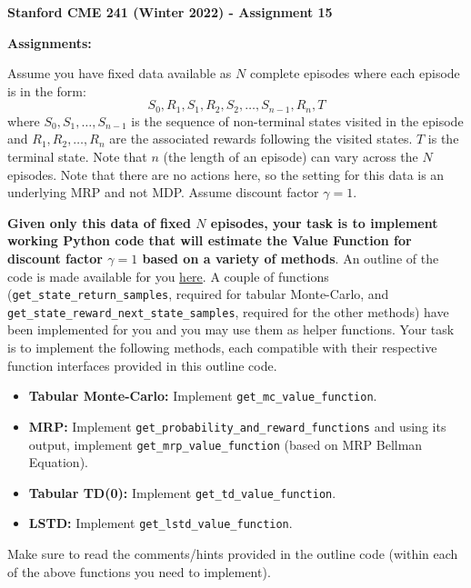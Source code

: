 \documentclass[12pt]{exam}
\begin{document}
\begin{center}
{\large {\bf Stanford CME 241 (Winter 2022) - Assignment 15}}
\end{center}
 
{\large{\bf Assignments:}}
\begin{questions}

\question Assume you have fixed data available as $N$ complete episodes where each episode is in the form:
$$S_0,R_1,S_1,R_2, S_2,\ldots, S_{n-1},R_n, T$$
where $S_0,S_1,\ldots,S_{n-1}$ is the sequence of non-terminal states visited in the episode and $R_1,R_2,\ldots,R_n$ are the associated rewards following the visited states. $T$ is the terminal state. Note that $n$ (the length of an episode) can vary across the $N$ episodes. Note that there are no actions here, so the setting for this data is an underlying MRP and not MDP. Assume discount factor $\gamma = 1$.

{\bf Given only this data of fixed $N$ episodes, your task is to implement working Python code that will estimate the Value Function for discount factor $\gamma = 1$ based on a variety of methods}. An outline of the code is made available for you \href{https://github.com/coverdrive/MDP-DP-RL/blob/master/src/examples/exam_problems/mrp_tdmc_outline.py}{here}. A couple of functions (\lstinline{get_state_return_samples}, required for tabular Monte-Carlo, and \lstinline{get_state_reward_next_state_samples}, required for the other methods) have been implemented for you and you may use them as helper functions. Your task is to implement the following methods, each compatible with their respective function interfaces provided in this outline code. 

\begin{itemize}
\item {\bf Tabular Monte-Carlo: } Implement \lstinline{get_mc_value_function}.
\item {\bf MRP: } Implement \lstinline{get_probability_and_reward_functions} and using its output, implement \lstinline{get_mrp_value_function} (based on MRP Bellman Equation).
\item {\bf Tabular TD(0): } Implement \lstinline{get_td_value_function}.
\item {\bf LSTD: } Implement \lstinline{get_lstd_value_function}.
\end{itemize}

Make sure to read the comments/hints provided in the outline code (within each of the above functions you need to implement).


\end{questions}
\end{document}
